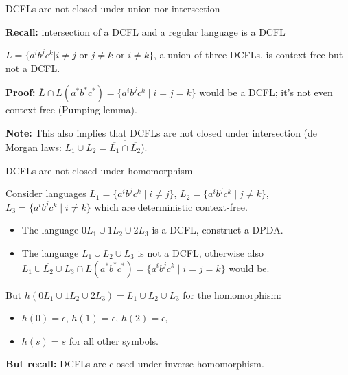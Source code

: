 \documentclass[handout]{beamer}
\begin{document}
\begin{frame}{DCFLs are not closed under union nor intersection}

    \textbf{Recall:} intersection of a DCFL and a regular language is a DCFL

    \begin{example}
        $L=\{a^ib^jc^k| i\neq j\text{ or }j\neq k\text{ or }i\neq k\} $, a union of three DCFLs, is context-free but not a DCFL.
    \end{example}
    \textbf{Proof:} $\overline{L}\cap L(a^*b^*c^*)=\{a^ib^jc^k\mid i=j=k\}$ would be a DCFL; it's not even context-free (Pumping lemma).
    \hfill\qedsymbol

    \textbf{Note:} This also implies that DCFLs are not closed under intersection (de Morgan laws: $L_1\cup L_2=\overline{\overline{L_1}\cap\overline{L_2}}$).

\end{frame}


\begin{frame}{DCFLs are not closed under homomorphism}
    
    \begin{example}
        Consider languages $L_1=\{a^ib^jc^k\mid i\neq j\}$, $L_2=\{a^ib^jc^k\mid j\neq k\}$, $L_3=\{a^ib^jc^k\mid i\neq k\}$ which are deterministic context-free.
        
        \begin{itemize}
            \item The language $0L_1\cup 1L_2\cup 2L_3$ is a DCFL, construct a DPDA.
            \item The language $L_1\cup L_2\cup L_3$ is not a DCFL, otherwise also $\overline{L_1\cup L_2\cup L_3} \cap L(a^*b^*c^*)=\{a^ib^jc^k\mid i=j=k\}$ would be.
        \end{itemize}
        
        But $h(0L_1\cup 1L_2\cup 2L_3)=L_1\cup L_2\cup L_3$ for the homomorphism:
        \begin{itemize}
            \item $h(0)=\epsilon$, $h(1)=\epsilon$, $h(2)=\epsilon$,
            \item $h(s)=s$ for all other symbols.
        \end{itemize}
    \end{example}

    \textbf{But recall:} DCFLs \alert{are} closed under \alert{inverse homomorphism}.

\end{frame}
\end{document}
